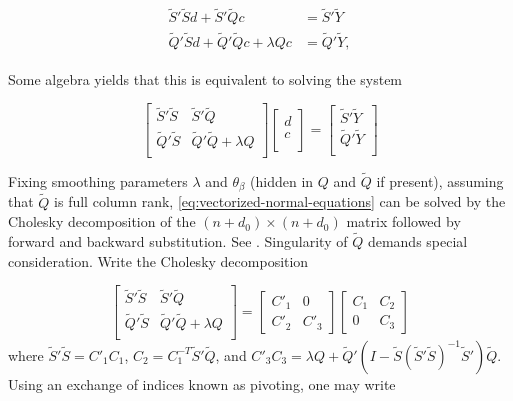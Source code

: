 \documentclass[12pt]{article}
\newcommand{\tildeY}{\tilde{Y}}
\newcommand{\tildeQ}{\tilde{Q}}
\newcommand{\tildeS}{\tilde{S}}
\theoremstyle{definition}
\begin{document}
\begin{align}
\begin{split}
\tildeS'\tildeS d + \tildeS'\tildeQ c &= \tildeS' \tildeY \\
\tildeQ'\tildeS d + \tildeQ'\tildeQ c + \lambda Q c &= \tildeQ' \tildeY, 
\end{split}
\end{align}

\noindent
Some algebra yields that this is equivalent to solving the system

\begin{equation} \label{eq:vectorized-normal-equations}
\begin{bmatrix}
\tildeS'\tildeS & \tildeS'\tildeQ \\
\tildeQ'\tildeS & \tildeQ'\tildeQ + \lambda Q\\
\end{bmatrix}
\begin{bmatrix}
d\\
c\\
\end{bmatrix}
= \begin{bmatrix}
\tildeS'\tildeY \\
 \tildeQ'\tildeY\\
\end{bmatrix}
\end{equation}

Fixing smoothing parameters $\lambda$ and $\theta_\beta$ (hidden in $Q$ and $\tildeQ$ if present), assuming that $\tildeQ$ is full column rank, \ref{eq:vectorized-normal-equations} can be solved by the Cholesky decomposition of the $\left( n + d_0 \right) \times \left( n + d_0 \right)$ matrix followed by forward and backward substitution. See \citet{golub2012matrix}. Singularity of $\tildeQ$ demands special consideration. Write the Cholesky decomposition

\begin{equation} \label{eq:normal-equation-cholesky}
\begin{bmatrix}
\tildeS'\tildeS & \tildeS'\tildeQ \\
\tildeQ'\tildeS & \tildeQ'\tildeQ + \lambda Q\\
\end{bmatrix}
= \begin{bmatrix}
C'_1 & 0 \\
C'_2  & C'_3 
\end{bmatrix}
\begin{bmatrix}
C_1 & C_2 \\
0  & C_3 
\end{bmatrix}
\end{equation}
\noindent
where $\tildeS'\tildeS = C'_1 C_1$, $C_2 = C_1^{-T} \tildeS' \tildeQ$, and $C'_3 C_3 = \lambda Q +  \tildeQ'\left( I - \tildeS\left( \tildeS' \tildeS \right)^{-1} \tildeS' \right)\tildeQ$. Using an exchange of indices known as pivoting, one may write 
\end{document}
